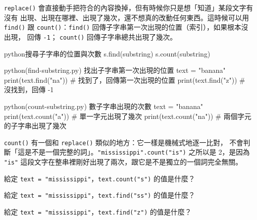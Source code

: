 \texttt{replace()} 會直接動手把符合的內容換掉，但有時候你只是想「知道」某段文字有沒有
出現、出現在哪裡、出現了幾次，還不想真的改動任何東西。這時候可以用 \texttt{find()} 跟
\texttt{count()}：\texttt{find()} 回傳子字串第一次出現的位置（索引），如果根本沒出現，
回傳 \texttt{-1}；
\texttt{count()} 回傳子字串總共出現了幾次。

\begin{code}{python}{搜尋子字串的位置與次數}
s.find(substring)
s.count(substring)
\end{code}

\begin{example}{python}{(find-substring.py) 找出子字串第一次出現的位置}
text = "banana"
print(text.find("na"))    # 找到了，回傳第一次出現的位置
print(text.find("z"))     # 沒找到，回傳 -1
\end{example}


\begin{example}{python}{(count-substring.py) 數子字串出現的次數}
text = "banana"
print(text.count("a"))    # 單一字元出現了幾次
print(text.count("na"))   # 兩個字元的子字串出現了幾次
\end{example}



\texttt{count()} 有一個和 \texttt{replace()} 類似的地方：它一樣是機械式地逐一比對，
不會判斷「這是不是一個完整的詞」。\texttt{"mississippi".count("is")} 之所以是 2，是因為
\texttt{"is"} 這段文字在整串裡剛好出現了兩次，跟它是不是獨立的一個詞完全無關。

\begin{drills}[label=drills:find-count]
\item 給定 \texttt{text = "mississippi"}，\texttt{text.count("s")} 的值是什麼？
\item 給定 \texttt{text = "mississippi"}，\texttt{text.find("ss")} 的值是什麼？
\item 給定 \texttt{text = "mississippi"}，\texttt{text.find("z")} 的值是什麼？
\end{drills}

